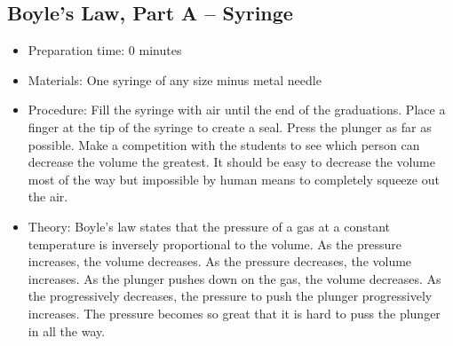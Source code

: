 \subsection{Boyle's Law, Part A -- Syringe}
\begin{itemize}
\item{Preparation time: 0 minutes}
\item{Materials: One syringe of any size minus metal needle}
\item{Procedure: Fill the syringe with air until the end of the graduations. Place a finger at the tip of the syringe to create a seal. Press the plunger as far as possible. Make a competition with the students to see which person can decrease the volume the greatest. It should be easy to decrease the volume most of the way but impossible by human means to completely squeeze out the air.}
\item{Theory: Boyle’s law states that the pressure of a gas at a constant temperature is inversely proportional to the volume. As the pressure increases, the volume decreases. As the pressure decreases, the volume increases. As the plunger pushes down on the gas, the volume decreases. As the progressively decreases, the pressure to push the plunger progressively increases. The pressure becomes so great that it is hard to puss the plunger in all the way.}
\end{itemize}

